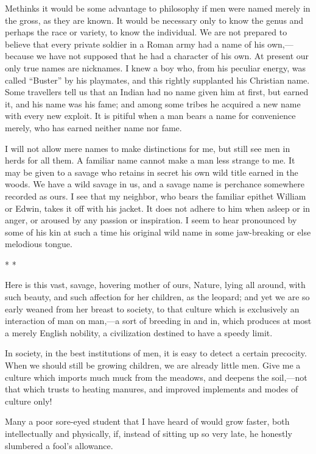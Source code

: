 \documentclass[twoside,openright,10pt]{memoir} %
\begin{document}
Methinks it would be some advantage to philosophy if men were named merely in the gross, as they are known. It would be necessary only to know the genus and perhaps the race or variety, to know the individual. We are not prepared to believe that every private soldier in a Roman army had a name of his own,—because we have not supposed that he had a character of his own. At present our only true names are nicknames. I knew a boy who, from his peculiar energy, was called “Buster” by his playmates, and this rightly supplanted his Christian name. Some travellers tell us that an Indian had no name given him at first, but earned it, and his name was his fame; and among some tribes he acquired a new name with every new exploit. It is pitiful when a man bears a name for convenience merely, who has earned neither name nor fame.

I will not allow mere names to make distinctions for me, but still see men in herds for all them. A familiar name cannot make a man less strange to me. It may be given to a savage who retains in secret his own wild title earned in the woods. We have a wild savage in us, and a savage name is perchance somewhere recorded as ours. I see that my neighbor, who bears the familiar epithet William or Edwin, takes it off with his jacket. It does not adhere to him when asleep or in anger, or aroused by any passion or inspiration. I seem to hear pronounced by some of his kin at such a time his original wild name in some jaw-breaking or else melodious tongue.
\begin{center}\tiny * * * \normalsize \end{center}
Here is this vast, savage, hovering mother of ours, Nature, lying all around, with such beauty, and such affection for her children, as the leopard; and yet we are so early weaned from her breast to society, to that culture which is exclusively an interaction of man on man,—a sort of breeding in and in, which produces at most a merely English nobility, a civilization destined to have a speedy limit.

In society, in the best institutions of men, it is easy to detect a certain precocity. When we should still be growing children, we are already little men. Give me a culture which imports much muck from the meadows, and deepens the soil,—not that which trusts to heating manures, and improved implements and modes of culture only!

Many a poor sore-eyed student that I have heard of would grow faster, both intellectually and physically, if, instead of sitting up so very late, he honestly slumbered a fool’s allowance.
\end{document}
